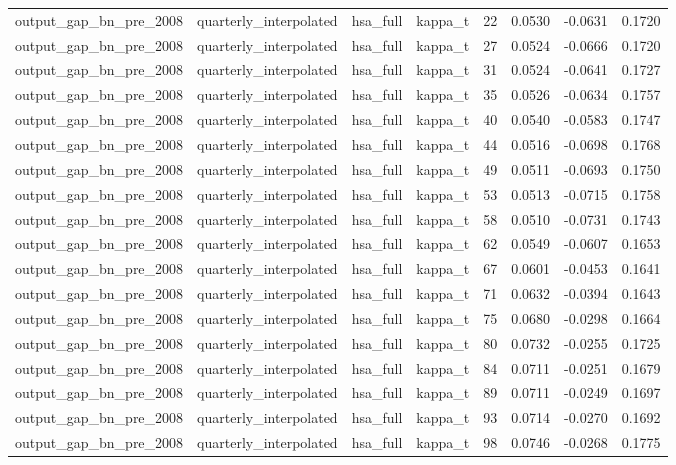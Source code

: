 \begin{tabular}{llllrrrr}
output\_gap\_bn\_pre\_2008 & quarterly\_interpolated & hsa\_full & kappa\_t & 22 & 0.0530 & -0.0631 & 0.1720 \\
output\_gap\_bn\_pre\_2008 & quarterly\_interpolated & hsa\_full & kappa\_t & 27 & 0.0524 & -0.0666 & 0.1720 \\
output\_gap\_bn\_pre\_2008 & quarterly\_interpolated & hsa\_full & kappa\_t & 31 & 0.0524 & -0.0641 & 0.1727 \\
output\_gap\_bn\_pre\_2008 & quarterly\_interpolated & hsa\_full & kappa\_t & 35 & 0.0526 & -0.0634 & 0.1757 \\
output\_gap\_bn\_pre\_2008 & quarterly\_interpolated & hsa\_full & kappa\_t & 40 & 0.0540 & -0.0583 & 0.1747 \\
output\_gap\_bn\_pre\_2008 & quarterly\_interpolated & hsa\_full & kappa\_t & 44 & 0.0516 & -0.0698 & 0.1768 \\
output\_gap\_bn\_pre\_2008 & quarterly\_interpolated & hsa\_full & kappa\_t & 49 & 0.0511 & -0.0693 & 0.1750 \\
output\_gap\_bn\_pre\_2008 & quarterly\_interpolated & hsa\_full & kappa\_t & 53 & 0.0513 & -0.0715 & 0.1758 \\
output\_gap\_bn\_pre\_2008 & quarterly\_interpolated & hsa\_full & kappa\_t & 58 & 0.0510 & -0.0731 & 0.1743 \\
output\_gap\_bn\_pre\_2008 & quarterly\_interpolated & hsa\_full & kappa\_t & 62 & 0.0549 & -0.0607 & 0.1653 \\
output\_gap\_bn\_pre\_2008 & quarterly\_interpolated & hsa\_full & kappa\_t & 67 & 0.0601 & -0.0453 & 0.1641 \\
output\_gap\_bn\_pre\_2008 & quarterly\_interpolated & hsa\_full & kappa\_t & 71 & 0.0632 & -0.0394 & 0.1643 \\
output\_gap\_bn\_pre\_2008 & quarterly\_interpolated & hsa\_full & kappa\_t & 75 & 0.0680 & -0.0298 & 0.1664 \\
output\_gap\_bn\_pre\_2008 & quarterly\_interpolated & hsa\_full & kappa\_t & 80 & 0.0732 & -0.0255 & 0.1725 \\
output\_gap\_bn\_pre\_2008 & quarterly\_interpolated & hsa\_full & kappa\_t & 84 & 0.0711 & -0.0251 & 0.1679 \\
output\_gap\_bn\_pre\_2008 & quarterly\_interpolated & hsa\_full & kappa\_t & 89 & 0.0711 & -0.0249 & 0.1697 \\
output\_gap\_bn\_pre\_2008 & quarterly\_interpolated & hsa\_full & kappa\_t & 93 & 0.0714 & -0.0270 & 0.1692 \\
output\_gap\_bn\_pre\_2008 & quarterly\_interpolated & hsa\_full & kappa\_t & 98 & 0.0746 & -0.0268 & 0.1775 \\

\end{tabular}
